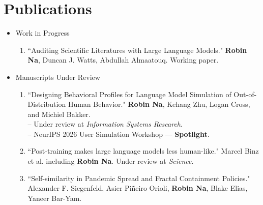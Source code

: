 \documentclass[11pt,a4paper,roman]{moderncv}        %
\begin{document}
\section{Publications}

\begin{itemize}
    \item Work in Progress
    \vspace{0.3em} %
    \small{
	\begin{enumerate}
        \item ``Auditing Scientific Literatures with Large Language Models." \textbf{Robin Na}, Duncan J. Watts, Abdullah Almaatouq. Working paper.
      
	\end{enumerate}}%
\end{itemize}

\vspace{0.7em} %

\newpage
\begin{itemize}
    \item Manuscripts Under Review
    \vspace{0.3em} %
    \small{
	\begin{enumerate}

	  \item ``Designing Behavioral Profiles for Language Model Simulation of Out-of-Distribution Human Behavior." \textbf{Robin Na}, Kehang Zhu, Logan Cross, and Michiel Bakker.\\
          -- Under review at \textit{Information Systems Research}.\\
          -- NeurIPS 2026 User Simulation Workshop --- \textbf{Spotlight}.
        \item ``Post-training makes large language models less human-like." Marcel Binz et al. including \textbf{Robin Na}. Under review at \textit{Science}.
        \item ``Self-similarity in Pandemic Spread and Fractal Containment Policies." Alexander F. Siegenfeld, Asier Pi\~neiro Orioli, \textbf{Robin Na}, Blake Elias, Yaneer Bar-Yam.
      
	\end{enumerate}}%
\end{itemize}

\vspace{0.7em} %
\end{document}
